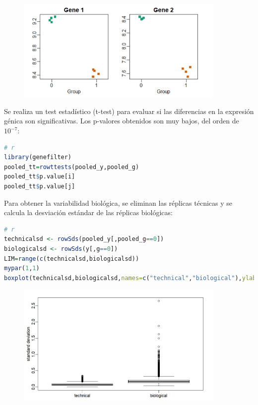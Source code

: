 \begin{figure}[h]
\centering
\includegraphics[width = 0.9\textwidth]{figs/expresion-genica.jpg}
\end{figure}

Se realiza un test estadístico (t-test) para evaluar si las diferencias en la expresión génica son significativas. Los p-valores obtenidos son muy bajos, del orden de $10^{-7}$:
\begin{lstlisting}[language=R]
# r
library(genefilter)
pooled_tt=rowttests(pooled_y,pooled_g)
pooled_tt$p.value[i]
pooled_tt$p.value[j]
\end{lstlisting}

Para obtener la variabilidad biológica, se eliminan las réplicas técnicas y se calcula la desviación estándar de las réplicas biológicas:
\begin{lstlisting}[language=R]
# r
technicalsd <- rowSds(pooled_y[,pooled_g==0])
biologicalsd <- rowSds(y[,g==0])
LIM=range(c(technicalsd,biologicalsd))
mypar(1,1)
boxplot(technicalsd,biologicalsd,names=c("technical","biological"),ylab="standard deviation")
\end{lstlisting}

\begin{figure}[h]
\centering
\includegraphics[width = 0.9\textwidth]{figs/variabilidad-biologica.jpg}
\end{figure}

